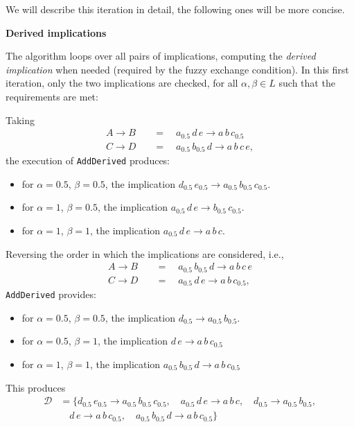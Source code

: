 \documentclass[
  letterpaper,
  DIV=11,
  numbers=noendperiod]{scrartcl}
\providecommand{\tightlist}{%
  \setlength{\itemsep}{0pt}\setlength{\parskip}{0pt}}\usepackage{longtable,booktabs,array}
\begin{document}
We will describe this iteration in detail, the following ones will be
more concise.

\textbf{Derived implications}

The algorithm loops over all pairs of implications, computing the
\emph{derived implication} when needed (required by the fuzzy exchange
condition). In this first iteration, only the two implications are
checked, for all \(\alpha,\beta\in L\) such that the requirements are
met:

Taking \begin{align*}
A\to B \quad& = \quad a_{0.5}\,d\,e \to a\,b\,c_{0.5} \\
C\to D \quad& = \quad a_{0.5}\,b_{0.5}\,d \to a\,b\,c\,e,
\end{align*} the execution of \texttt{AddDerived} produces:

\begin{itemize}
\tightlist
\item
  for \(\alpha = 0.5\), \(\beta = 0.5\), the implication
  \(d_{0.5}\,e_{0.5} \to a_{0.5}\,b_{0.5}\,c_{0.5}\).
\item
  for \(\alpha = 1\), \(\beta = 0.5\), the implication
  \(a_{0.5}\,d\,e \to b_{0.5}\,c_{0.5}\).
\item
  for \(\alpha = 1\), \(\beta = 1\), the implication
  \(a_{0.5}\,d\,e \to a\,b\,c\).
\end{itemize}

Reversing the order in which the implications are considered, i.e.,
\begin{align*}
A\to B \quad& =  \quad a_{0.5}\,b_{0.5}\,d \to a\,b\,c\,e \\
C\to D \quad& = \quad a_{0.5}\,d\,e \to a\,b\,c_{0.5},
\end{align*} \texttt{AddDerived} provides:

\begin{itemize}
\tightlist
\item
  for \(\alpha = 0.5\), \(\beta = 0.5\), the implication
  \(d_{0.5} \to a_{0.5}\,b_{0.5}\).
\item
  for \(\alpha = 0.5\), \(\beta = 1\), the implication
  \(d\,e \to a\,b\,c_{0.5}\)
\item
  for \(\alpha = 1\), \(\beta = 1\), the implication
  \(a_{0.5}\,b_{0.5}\,d \to a\,b\,c_{0.5}\)
\end{itemize}

This produces \begin{align*}
\mathcal D &= \big\{d_{0.5}\,e_{0.5} \to a_{0.5}\,b_{0.5}\,c_{0.5},\quad a_{0.5}\,d\,e \to a\,b\,c,\quad d_{0.5} \to a_{0.5}\,b_{0.5},\\
& \quad d\,e \to a\,b\,c_{0.5},\quad a_{0.5}\,b_{0.5}\,d \to a\,b\,c_{0.5}\big\}
\end{align*}
\end{document}
